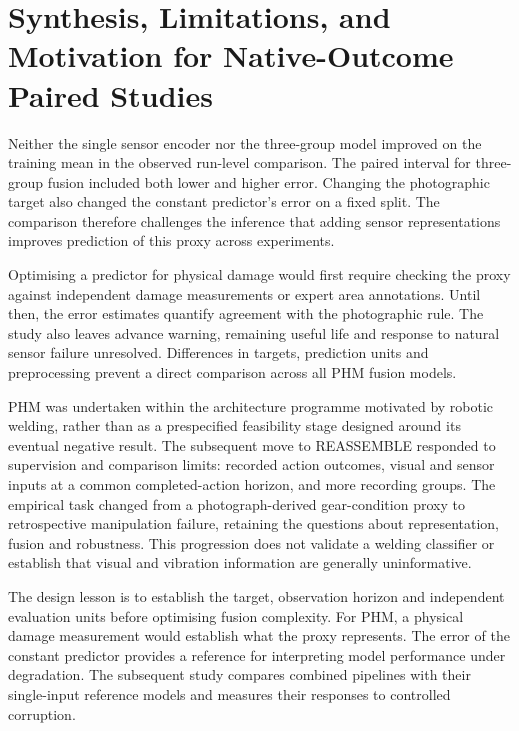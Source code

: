 \section{Synthesis, Limitations, and Motivation for Native-Outcome Paired Studies}
Neither the single sensor encoder nor the three-group model improved on the training
mean in the observed run-level comparison. The paired interval for three-group fusion
included both lower and higher error. Changing the photographic target also changed the
constant predictor's error on a fixed split. The comparison therefore challenges the
inference that adding sensor representations improves prediction of this proxy across
experiments.

Optimising a predictor for physical damage would first require checking the proxy
against independent damage measurements or expert area annotations. Until then, the
error estimates quantify agreement with the photographic rule. The study also leaves
advance warning, remaining useful life and response to natural sensor failure
unresolved. Differences in targets, prediction units and preprocessing prevent a direct comparison
across all PHM fusion models.

PHM was undertaken within the architecture programme motivated by robotic welding,
rather than as a prespecified feasibility stage designed around its eventual negative
result. The subsequent move to REASSEMBLE responded to supervision and comparison
limits: recorded action outcomes, visual and sensor inputs at a common completed-action
horizon, and more recording groups. The empirical task changed from a photograph-derived
gear-condition proxy to retrospective manipulation failure, retaining the questions
about representation, fusion and robustness. This progression does not validate a
welding classifier or establish that visual and vibration information are generally
uninformative.

The design lesson is to establish the target, observation horizon and independent
evaluation units before optimising fusion complexity. For PHM, a physical damage
measurement would establish what the proxy represents. The error of the constant
predictor provides a reference for interpreting model performance under degradation. The
subsequent study compares combined pipelines with their single-input reference models
and measures their responses to controlled corruption.
